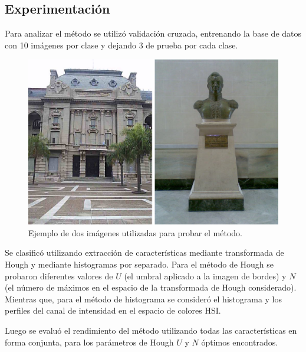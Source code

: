 \documentclass[conference,a4paper,10pt,oneside,final]{tfmpd}
\begin{document}
\subsection{Experimentación}
Para analizar %
el método se utilizó validación cruzada, entrenando la base de
datos con 10 imágenes por clase y dejando 3 de prueba por cada clase.

\begin{figure}
\begin{center}
\includegraphics[scale=0.25]{../diagramas/dibujo} 
\end{center}
\caption{Ejemplo de dos imágenes utilizadas para probar el método.}
\label{imagenes}
\end{figure}

Se 
clasificó utilizando extracción de características mediante
transformada de Hough y mediante histogramas por separado. Para el método de Hough
se probaron diferentes valores de $U$ (el umbral
aplicado a la imagen de bordes) y $N$ (el número de máximos en el espacio de
la transformada de Hough considerado). Mientras que, 
para el método de histograma se consideró el histograma y los perfiles del canal de
intensidad en el espacio de colores HSI.

Luego se evaluó el rendimiento del método utilizando todas las características %
en forma conjunta, para los parámetros de Hough $U$ y $N$ óptimos encontrados.
\end{document}
